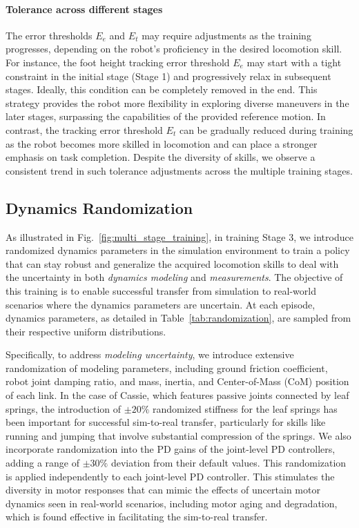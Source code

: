 \paragraph{Tolerance across different stages}
The error thresholds $E_e$ and $E_t$ may require adjustments as the training progresses, depending on the robot's proficiency in the desired locomotion skill. 
For instance, the foot height tracking error threshold $E_e$ may start with a tight constraint in the initial stage (Stage 1) and progressively relax in subsequent stages.
Ideally, this condition can be completely removed in the end.
This strategy provides the robot more flexibility in exploring diverse maneuvers in the later stages, surpassing the capabilities of the provided reference motion. 
In contrast, the tracking error threshold $E_t$ can be gradually reduced during training as the robot becomes more skilled in locomotion and can place a stronger emphasis on task completion.
Despite the diversity of skills, we observe a consistent trend in such tolerance adjustments across the multiple training stages.



\subsection{Dynamics Randomization}\label{subsec:domain_rand}

As illustrated in Fig.~\ref{fig:multi_stage_training}, in training Stage 3, we introduce randomized dynamics parameters in the simulation environment to train a policy that can stay robust and generalize the acquired locomotion skills to deal with the uncertainty in both \textit{dynamics modeling} and \textit{measurements}. 
The objective of this training is to enable successful transfer from simulation to real-world scenarios where the dynamics parameters are uncertain.
At each episode, dynamics parameters, as detailed in Table~\ref{tab:randomization}, are sampled from their respective uniform distributions. 

Specifically, to address \textit{modeling uncertainty}, we introduce extensive randomization of modeling parameters, including ground friction coefficient, robot joint damping ratio, and mass, inertia, and Center-of-Mass (CoM) position of each link. 
In the case of Cassie, which features passive joints connected by leaf springs, the introduction of $\pm20\%$ randomized stiffness for the leaf springs has been important for successful sim-to-real transfer, particularly for skills like running and jumping that involve substantial compression of the springs.
We also incorporate randomization into the PD gains of the joint-level PD controllers, adding a range of $\pm30\%$ deviation from their default values. 
This randomization is applied independently to each joint-level PD controller. 
This stimulates the diversity in motor responses that can mimic the effects of uncertain motor dynamics seen in real-world scenarios, including motor aging and degradation, which is found effective in facilitating the sim-to-real transfer.

